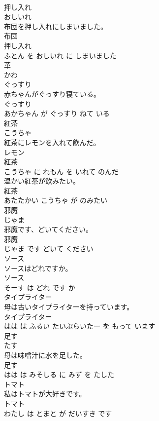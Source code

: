 \documentclass[8pt]{extreport}
\begin{document}
\begin{CJK}{UTF8}{min}
\\	押し入れ	
\\	おしいれ			
\\	布団を押し入れにしまいました。	
\\	布団 
\\	押し入れ 
\\	ふとん を おしいれ に しまいました			
\\	革	
\\	かわ			
\\	ぐっすり	
\\	赤ちゃんがぐっすり寝ている。	
\\	ぐっすり 
\\	あかちゃん が ぐっすり ねて いる			
\\	紅茶	
\\	こうちゃ			
\\	紅茶にレモンを入れて飲んだ。	
\\	レモン 
\\	紅茶 
\\	こうちゃ に れもん を いれて のんだ			
\\	温かい紅茶が飲みたい。	
\\	紅茶 
\\	あたたかい こうちゃ が のみたい			
\\	邪魔	
\\	じゃま			
\\	邪魔です、どいてください。	
\\	邪魔 
\\	じゃま です どいて ください			
\\	ソース	
\\	ソースはどれですか。	
\\	ソース 
\\	そーす は どれ です か			
\\	タイプライター	
\\	母は古いタイプライターを持っています。	
\\	タイプライター 
\\	はは は ふるい たいぷらいたー を もって います			
\\	足す	
\\	たす			
\\	母は味噌汁に水を足した。	
\\	足す 
\\	はは は みそしる に みず を たした			
\\	トマト	
\\	私はトマトが大好きです。	
\\	トマト 
\\	わたし は とまと が だいすき です			

\end{CJK}
\end{document}
